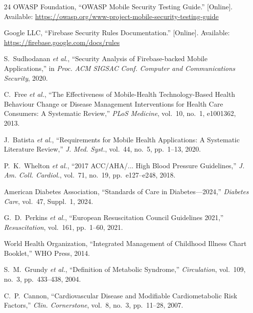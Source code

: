 \documentclass[journal,onecolumn,web]{ieeecolor}
\begin{document}
\begin{thebibliography}{24}
OWASP Foundation, ``OWASP Mobile Security Testing
Guide.'' [Online]. Available:
\url{https://owasp.org/www-project-mobile-security-testing-guide}

Google LLC, ``Firebase Security Rules
Documentation.'' [Online]. Available:
\url{https://firebase.google.com/docs/rules}

S.~Sudhodanan {\it et al.}, ``Security Analysis of
Firebase-backed Mobile Applications,'' in {\it Proc.
ACM SIGSAC Conf. Computer and Communications
Security}, 2020.

C.~Free {\it et al.}, ``The Effectiveness of
Mobile-Health Technology-Based Health Behaviour
Change or Disease Management Interventions for
Health Care Consumers: A Systematic Review,''
{\it PLoS Medicine}, vol.~10, no.~1, e1001362,
2013.

J.~Batista {\it et al.}, ``Requirements for Mobile
Health Applications: A Systematic Literature
Review,'' {\it J. Med. Syst.}, vol.~44, no.~5,
pp.~1--13, 2020.

P.~K.~Whelton {\it et al.}, ``2017
ACC/AHA/... High Blood Pressure Guidelines,''
{\it J. Am. Coll. Cardiol.}, vol.~71, no.~19,
pp.~e127--e248, 2018.

American Diabetes Association, ``Standards of Care
in Diabetes---2024,'' {\it Diabetes Care}, vol.~47,
Suppl.~1, 2024.

G.~D.~Perkins {\it et al.}, ``European
Resuscitation Council Guidelines 2021,''
{\it Resuscitation}, vol.~161, pp.~1--60, 2021.

World Health Organization, ``Integrated Management
of Childhood Illness Chart Booklet,'' WHO Press,
2014.

S.~M.~Grundy {\it et al.}, ``Definition of
Metabolic Syndrome,'' {\it Circulation}, vol.~109,
no.~3, pp.~433--438, 2004.

C.~P.~Cannon, ``Cardiovascular Disease and
Modifiable Cardiometabolic Risk Factors,''
{\it Clin. Cornerstone}, vol.~8, no.~3,
pp.~11--28, 2007.

\end{thebibliography}

\end{document}
